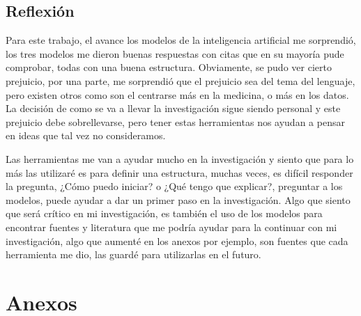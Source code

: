 \documentclass{article}
\begin{document}
\subsection{Reflexión}
Para este trabajo, el avance los modelos de la inteligencia
artificial me sorprendió, los tres modelos me dieron buenas
respuestas con citas que en su mayoría pude comprobar, todas
con una buena estructura. Obviamente, se pudo ver cierto
prejuicio, por una parte, me sorprendió que el prejuicio sea del
tema del lenguaje, pero existen otros como son el centrarse
más en la medicina, o más en los datos. La decisión de como
se va a llevar la investigación sigue siendo personal y este
prejuicio debe sobrellevarse, pero tener estas herramientas
nos ayudan a pensar en ideas que tal vez no consideramos.

Las herramientas me van a ayudar mucho en la investigación y
siento que para lo más las utilizaré es para definir una
estructura, muchas veces, es difícil responder la pregunta,
¿Cómo puedo iniciar? o ¿Qué tengo que explicar?, preguntar a
los modelos, puede ayudar a dar un primer paso en la
investigación. Algo que siento que será crítico en mi
investigación, es también el uso de los modelos para
encontrar fuentes y literatura que me podría ayudar para la
continuar con mi investigación, algo que aumenté en los
anexos por ejemplo, son fuentes que cada herramienta me dio,
las guardé para utilizarlas en el futuro.

\newpage
\section{Anexos}
\end{document}
